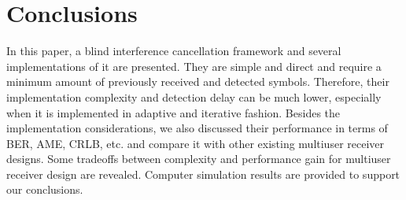 \documentclass[conference]{IEEEtran}
\begin{document}
\section{Conclusions}
In this paper, a blind interference cancellation framework and
several implementations of it are presented. They are simple and
direct and require a minimum amount of previously received and
detected symbols. Therefore, their implementation complexity and
detection delay can be much lower, especially when it is
implemented in adaptive and iterative fashion. Besides the
implementation considerations, we also discussed their performance
in terms of BER, AME, CRLB, etc. and compare it with other
existing multiuser receiver designs.  Some tradeoffs between
complexity and performance gain for multiuser receiver design are
revealed. Computer simulation results are provided to support our
conclusions.



\end{document}
